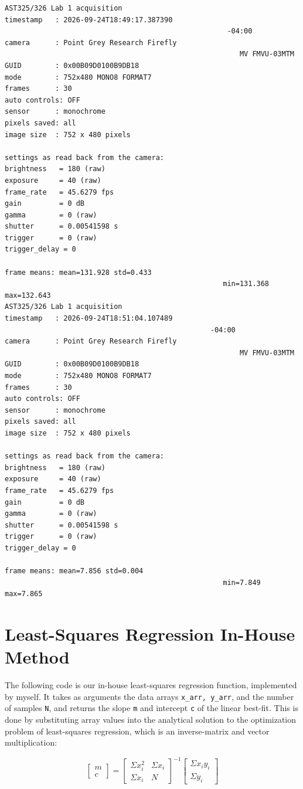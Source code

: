 \documentclass[preprint2]{aastex702}
\begin{document}
			\twocolumngrid
			\begin{verbatim}
AST325/326 Lab 1 acquisition
timestamp   : 2026-09-24T18:49:17.387390
													 -04:00
camera      : Point Grey Research Firefly 
														MV FMVU-03MTM
GUID        : 0x00B09D0100B9DB18
mode        : 752x480 MONO8 FORMAT7
frames      : 30
auto controls: OFF
sensor      : monochrome
pixels saved: all
image size  : 752 x 480 pixels

settings as read back from the camera:
brightness   = 180 (raw)
exposure     = 40 (raw)
frame_rate   = 45.6279 fps
gain         = 0 dB
gamma        = 0 (raw)
shutter      = 0.00541598 s
trigger      = 0 (raw)
trigger_delay = 0 

frame means: mean=131.928 std=0.433
													min=131.368 max=132.643
AST325/326 Lab 1 acquisition
timestamp   : 2026-09-24T18:51:04.107489
									 			 -04:00
camera      : Point Grey Research Firefly 
														MV FMVU-03MTM
GUID        : 0x00B09D0100B9DB18
mode        : 752x480 MONO8 FORMAT7
frames      : 30
auto controls: OFF
sensor      : monochrome
pixels saved: all
image size  : 752 x 480 pixels

settings as read back from the camera:
brightness   = 180 (raw)
exposure     = 40 (raw)
frame_rate   = 45.6279 fps
gain         = 0 dB
gamma        = 0 (raw)
shutter      = 0.00541598 s
trigger      = 0 (raw)
trigger_delay = 0 

frame means: mean=7.856 std=0.004 
													min=7.849 max=7.865
			\end{verbatim}
		\onecolumngrid

		\section{Least-Squares Regression In-House Method}\label{regr-code}

			The following code is our in-house least-squares regression function, implemented by myself. It takes as arguments the data arrays \texttt{x\_arr, y\_arr}, and the number of samples \texttt{N}, and returns the slope \texttt{m} and intercept \texttt{c} of the linear best-fit. This is done by substituting array values into the analytical solution to the optimization problem of least-squares regression, which is an inverse-matrix and vector multiplication:

			\begin{equation}
				\begin{bmatrix}
					m \\
					c
				\end{bmatrix}
				=
				\begin{bmatrix}
					\Sigma{x_i^2} & \Sigma{x_i} \\
					\Sigma{x_i} & N
				\end{bmatrix}^{-1}
				\begin{bmatrix}
					\Sigma{x_iy_i} \\
					\Sigma{y_i}
				\end{bmatrix}
			\end{equation}
\end{document}

